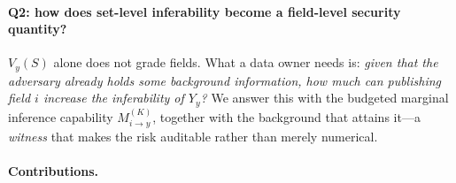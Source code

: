 \documentclass[preprint,12pt]{elsarticle}
\newcommand{\Vy}{V_{y}}
\newcommand{\Mik}{M^{(K)}_{i \to y}}
\begin{document}
\paragraph{Q2: how does set-level inferability become a field-level security quantity?}
$\Vy(S)$ alone does not grade fields. What a data owner needs is: \emph{given that the
adversary already holds some background information, how much can publishing field $i$
increase the inferability of $Y_y$?} We answer this with the budgeted marginal inference
capability $\Mik$, together with the background that attains it---a \emph{witness} that
makes the risk auditable rather than merely numerical.

\paragraph{Contributions.}
\end{document}
